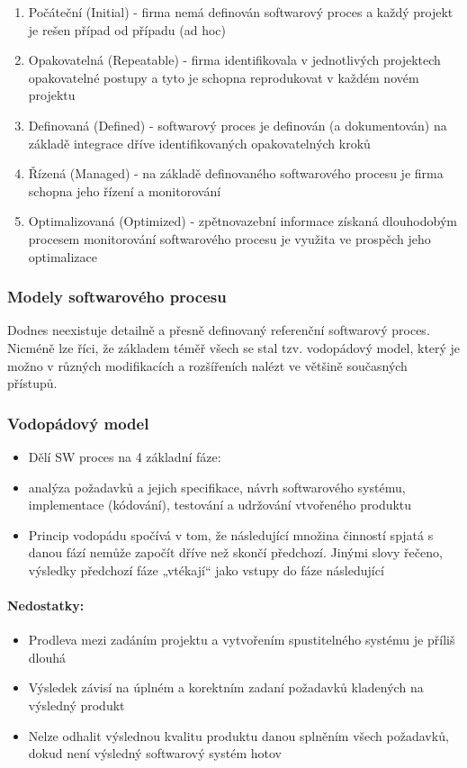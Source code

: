 \documentclass[10pt,a4paper]{article}
\begin{document}
\begin{enumerate}
\item Počáteční (Initial) - firma nemá definován softwarový proces a každý projekt je rešen případ od případu (ad hoc)
\item Opakovatelná (Repeatable) - firma identifikovala v jednotlivých projektech opakovatelné postupy a tyto je schopna reprodukovat v každém novém projektu
\item Definovaná (Defined) - softwarový proces je definován (a dokumentován) na základě integrace dříve identifikovaných opakovatelných kroků
\item Řízená (Managed) - na základě definovaného softwarového procesu je firma schopna jeho řízení a monitorování
\item Optimalizovaná (Optimized) - zpětnovazební informace získaná dlouhodobým procesem monitorování softwarového procesu je využita ve prospěch jeho optimalizace
\end{enumerate}
\subsubsection{Modely softwarového procesu}
Dodnes neexistuje detailně a přesně definovaný referenční softwarový proces. Nicméně lze říci, že základem téměř všech se stal tzv. vodopádový model, který je možno v různých modifikacích a rozšířeních nalézt ve většině současných přístupů.
\subsubsection{Vodopádový model}

\begin{itemize}
\item Dělí SW proces na 4 základní fáze:
\item analýza požadavků a jejich specifikace, návrh softwarového systému, implementace (kódování), testování a udržování vtvořeného produktu
\item Princip vodopádu spočívá v tom, že následující množina činností spjatá s danou fází nemůže započít dříve než skončí předchozí. Jinými slovy řečeno, výsledky předchozí fáze „vtékají“ jako vstupy do fáze následující
\end{itemize}
\paragraph{Nedostatky:}

\begin{itemize}
\item Prodleva mezi zadáním projektu a vytvořením spustitelného systému je příliš dlouhá
\item Výsledek závisí na úplném a korektním zadaní požadavků kladených na výsledný produkt
\item Nelze odhalit výslednou kvalitu produktu danou splněním všech požadavků, dokud není výsledný softwarový systém hotov
\end{itemize}
\end{document}
